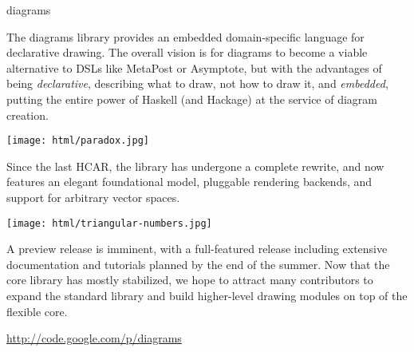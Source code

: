 \begin{hcarentry}[updated]{diagrams}
\makeheader

The diagrams library provides an embedded domain-specific language for
declarative drawing.  The overall vision is for diagrams to become a
viable alternative to DSLs like MetaPost or Asymptote, but with the
advantages of being \emph{declarative}, describing what to draw, not
how to draw it, and \emph{embedded}, putting the entire power of
Haskell (and Hackage) at the service of diagram creation.

\begin{center}
\texttt{[image: html/paradox.jpg]}
\end{center}

Since the last HCAR, the library has undergone a complete rewrite, and
now features an elegant foundational model, pluggable rendering
backends, and support for arbitrary vector spaces.

\begin{center}
\texttt{[image: html/triangular-numbers.jpg]}
\end{center}

\FuturePlans

A preview release is imminent, with a full-featured release including
extensive documentation and tutorials planned by the end of the
summer.  Now that the core library has mostly stabilized, we hope to
attract many contributors to expand the standard library and build
higher-level drawing modules on top of the flexible core.

\FurtherReading
\url{http://code.google.com/p/diagrams}
\end{hcarentry}
